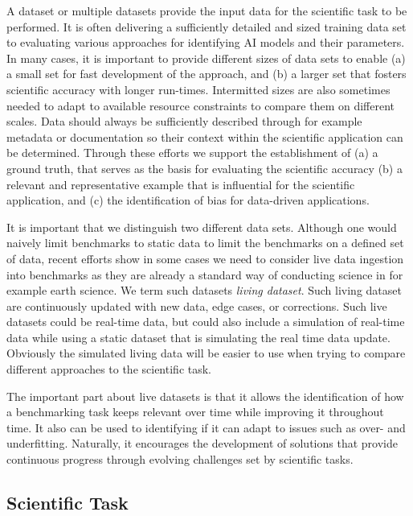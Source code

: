 A dataset or multiple datasets provide the input data for the scientific task to be performed.
It is often delivering a sufficiently detailed and sized training data set to  evaluating various approaches for identifying AI models and their parameters.
In many cases, it is important to provide different sizes of data sets to enable (a) a small set for fast development of the approach, and (b) a larger set that fosters scientific accuracy with longer run-times.
Intermitted sizes are also sometimes needed to adapt to available resource constraints to compare them on different scales.
Data should always be sufficiently described through for example metadata or documentation so their context within the scientific application can be determined.
Through these efforts we support the establishment of (a) 
a ground truth, that serves as the basis for evaluating the scientific accuracy (b) a relevant and representative example that is influential for the scientific application, and (c) the identification of bias for data-driven applications.

It is important that we distinguish two different data sets.
Although one would naively limit benchmarks to static data to limit the benchmarks on a defined set of data, recent efforts show in some cases we need to consider live data ingestion into benchmarks as they are already a standard way of conducting science in for example earth science.
We term such datasets {\em living dataset}.
Such living dataset are continuously updated with new data, edge cases, or corrections.
Such live datasets could be real-time data, but could also include a simulation of real-time data while using a static dataset that is simulating the real time data update. 
Obviously the simulated living data will be easier to use when trying to compare different approaches to the scientific task.

The important part about live datasets is that it allows the identification of how a benchmarking task keeps relevant over time while improving it throughout time.
It also can be used to identifying if it can adapt to issues such as over- and underfitting.
Naturally, it encourages the development of solutions that provide continuous progress through evolving challenges set by scientific tasks.

\subsection{Scientific Task}
\label{subsec:towards-task}

